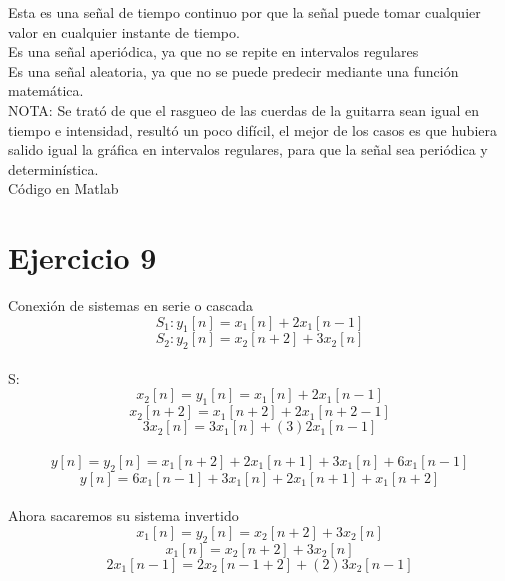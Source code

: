 \documentclass[10pt,a4paper]{report}
\begin{document}
\begin{enumerate}
Esta es una señal de tiempo continuo por que la señal puede tomar cualquier valor en cualquier instante de tiempo. \\
Es una señal aperiódica, ya que no se repite en intervalos regulares \\
Es una señal aleatoria, ya que no se puede predecir mediante una función matemática.\\
NOTA: Se trató de que el rasgueo de las cuerdas de la guitarra sean igual en tiempo e intensidad, resultó un poco difícil, el mejor de los casos es que hubiera salido igual la gráfica en intervalos regulares, para que la señal sea periódica y determinística.\\
\newline Código en Matlab
    

\end{enumerate}

\section{Ejercicio 9}

Conexión de sistemas en serie o cascada\\
\[
S_{1}: y_{1}\left [ n \right ]=x_{1}\left [ n \right ]+2x_{1}\left [ n-1 \right ]
\]
\[
S_{2}: y_{2}\left [ n \right ]=x_{2}\left [ n+2 \right ]+3x_{2}\left [ n \right ]
\]\\

S:\\
\[
x_{2}\left [ n \right ]=y_{1}\left [ n \right ]=x_{1}\left [ n \right ]+2x_{1}\left [ n-1 \right ]
\]
\[
x_{2}\left [ n+2 \right ]=x_{1}\left [ n+2 \right ]+2x_{1}\left [ n+2-1 \right ]
\]
\[
3x_{2}\left [ n \right ]=3x_{1}\left [ n \right ]+(3)2x_{1}\left [ n-1 \right ]
\]\\

\[
y\left [ n \right ]=y_{2}\left [ n \right ]=x_{1}\left [ n+2 \right ]+2x_{1}\left [ n+1 \right ]+3x_{1}\left [ n \right ]+6x_{1}\left [ n-1 \right ]
\]
\[
y\left [ n \right ]=6x_{1}\left [ n-1 \right ]+3x_{1}\left [ n \right ]+2x_{1}\left [ n+1 \right ]+x_{1}\left [ n+2 \right ]
\]\\

Ahora sacaremos su sistema invertido\\
\[
x_{1}\left [ n \right ]=y_{2}\left [ n \right ]=x_{2}\left [ n+2 \right ]+3x_{2}\left [ n \right ]
\]
\[
x_{1}\left [ n \right ]=x_{2}\left [ n+2 \right ]+3x_{2}\left [ n \right ]
\]
\[
2x_{1}\left [ n-1 \right ]=2x_{2}\left [ n-1+2 \right ]+(2)3x_{2}\left [ n-1 \right ]
\]\\
\end{document}
